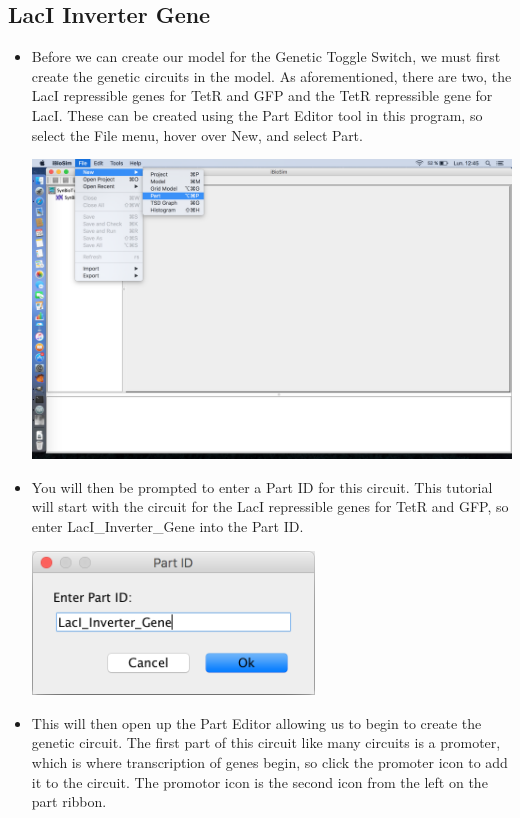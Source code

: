 \documentclass[titlepage,11pt]{article}
\begin{document}
\subsection{LacI Inverter Gene}
\begin{itemize}
\item Before we can create our model for the Genetic Toggle Switch, we must first create the genetic circuits in the model. As aforementioned, there are two, the LacI repressible genes for TetR and GFP and the TetR repressible gene for LacI. These can be created using the Part Editor tool in this program, so select the File menu, hover over New, and select Part.

\begin{center}
\includegraphics[width=160mm]{screenshots/newPart}
\end{center}

\item You will then be prompted to enter a Part ID for this circuit. This tutorial will start with the circuit for the LacI repressible genes for TetR and GFP, so enter LacI\_Inverter\_Gene into the Part ID. 

\begin{center}
\includegraphics[width=75mm]{screenshots/PartIdGT}
\end{center}

\item This will then open up the Part Editor allowing us to begin to create the genetic circuit. The first part of this circuit like many circuits is a promoter, which is where transcription of genes begin, so click the promoter icon to add it to the circuit. The promotor icon is the second icon from the left on the part ribbon.


\end{itemize}
\end{document}

